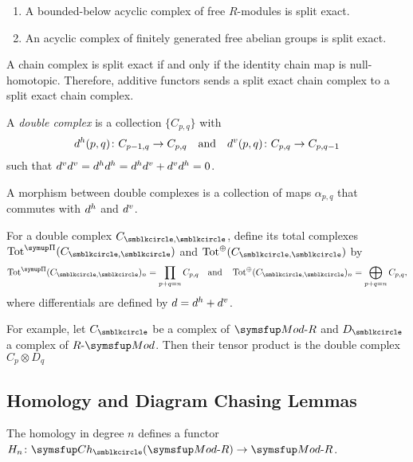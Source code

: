 \begin{proposition}\hspace*{\fill}
  \begin{enumerate}
    \item A bounded-below acyclic complex of free $R$-modules is split exact.
    \item An acyclic complex of finitely generated free abelian groups is split exact.
  \end{enumerate}
\end{proposition}

\begin{proposition}
  A chain complex is split exact if and only if the identity chain map is null-homotopic. Therefore, additive functors sends a split exact chain complex to a split exact chain complex.
\end{proposition}

A \emph{double complex} is a collection $\{C_{p, q}\}$ with
\begin{equation*}
  d^h(p, q)\colon C_{p-1, q}\to C_{p, q} \text{\quad and\quad} d^v(p, q)\colon C_{p, q}\to C_{p, q-1}
\end{equation*}
such that $d^vd^v=d^hd^h=d^hd^v+d^vd^h=0$.

A morphism between double complexes is a collection of maps $\alpha_{p, q}$ that commutes with $d^h$ and $d^v$.

For a double complex $C_{\CCCIR,\CCCIR}$, define its total complexes $\TOTP(C_{\CCCIR,\CCCIR})$ and $\TOT^\oplus(C_{\CCCIR,\CCCIR})$ by
\begin{equation*}
  \TOTP(C_{\CCCIR,\CCCIR})_n = \prod_{p+q=n}C_{p,q}\text{\quad and\quad}\TOT^\oplus(C_{\CCCIR,\CCCIR})_n = \bigoplus_{p+q=n}C_{p,q},
\end{equation*}
where differentials are defined by $d=d^h+d^v$.

For example, let $C_{\CCCIR}$ be a complex of $\MODR$ and $D_{\CCCIR}$ a complex of $\RMOD$. Then their tensor product is the double complex $C_p\otimes D_q$

\begin{proposition}

\end{proposition}

\subsection{Homology and Diagram Chasing Lemmas}

The homology in degree $n$ defines a functor $H_n\colon\CH(\MODR)\to\MODR$.

